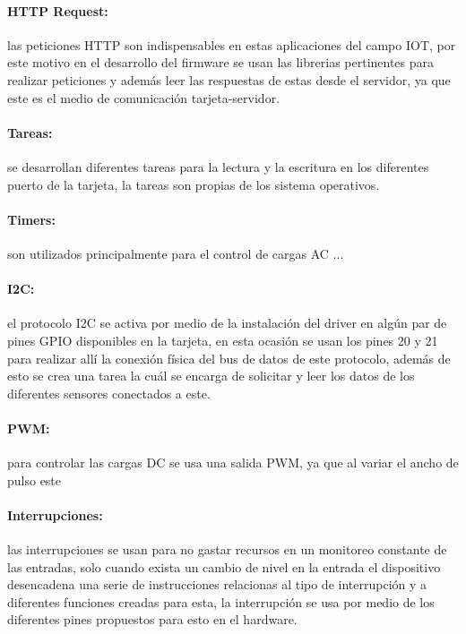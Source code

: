 \paragraph{HTTP Request:}

las peticiones HTTP son indispensables en estas aplicaciones del campo IOT, por este motivo en el desarrollo del firmware se usan las librerias pertinentes para realizar peticiones y además leer las respuestas de estas desde el servidor, ya que este es el medio de comunicación tarjeta-servidor.

\paragraph{Tareas:}

se desarrollan diferentes tareas para la lectura y la escritura en los diferentes puerto de la tarjeta, la tareas son propias de los sistema operativos.

\paragraph{Timers:}

son utilizados principalmente para el control de cargas AC ...

\paragraph{I2C:}

el protocolo I2C se activa por medio de la instalación del driver en algún par de pines GPIO disponibles en la tarjeta, en esta ocasión se usan los pines 20 y 21 para realizar allí la conexión física del bus de datos de este protocolo, además de esto se crea una tarea la cuál se encarga de solicitar y leer los datos de los diferentes sensores conectados a este.

\paragraph{PWM:}

para controlar las cargas DC se usa una salida PWM, ya que al variar el ancho de pulso este

\paragraph{Interrupciones:}

las interrupciones se usan para no gastar recursos en un monitoreo constante de las entradas, solo cuando exista un cambio de nivel en la entrada el dispositivo desencadena una serie de instrucciones relacionas al tipo de interrupción y a diferentes funciones creadas para esta, la interrupción se usa por medio de los diferentes pines propuestos para esto en el hardware.

